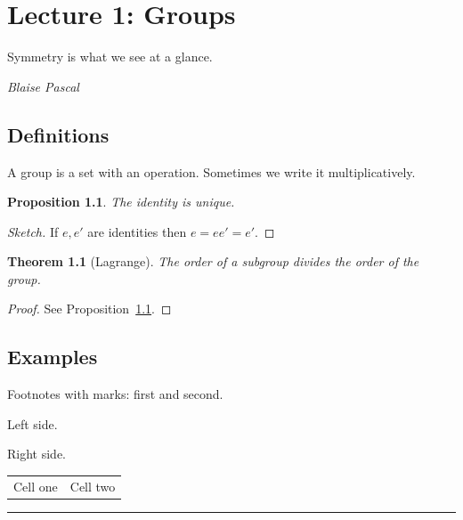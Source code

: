\documentclass[11pt,article,oneside]{memoir}
\newtheorem{prop}{Proposition}
\newtheorem*{thm*}{Theorem}
\begin{document}
\chapter{Lecture 1: Groups}
\epigraph{Symmetry is what we see at a glance.}{\textit{Blaise Pascal}}

\section{Definitions}
A group is a set with an operation. Sometimes we write it multiplicatively.

\begin{prop}\label{prop:id}
The identity is unique.
\end{prop}
\begin{proof}[Sketch]
If $e, e'$ are identities then $e = ee' = e'$.
\end{proof}

\begin{thm*}[Lagrange]
The order of a subgroup divides the order of the group.
\end{thm*}

\begin{proof}
See Proposition~\ref{prop:id}.
\renewcommand{\qedsymbol}{$\square$}
\end{proof}

\section{Examples}
Footnotes with marks: first\footnotemark{} and second\footnotemark{}.

\begin{center}
\begin{minipage}{0.45\textwidth}
Left side.
\end{minipage}\hfill
\begin{minipage}{0.45\textwidth}
Right side.
\end{minipage}
\end{center}

\noindent\begin{tabular}{@{}p{}p{}@{}}
Cell one & Cell two
\end{tabular}

\vspace{\baselineskip}
\hrule
\end{document}
